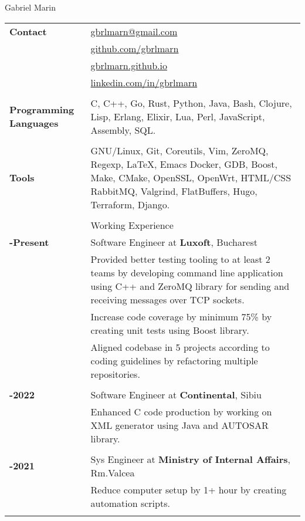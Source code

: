 \documentclass[a4paper,12pt]{article}
\begin{document}
\par {
  {\Huge Gabriel Marin}
  \bigskip
}

\begin{tabular}{>{\raggedleft\bfseries\arraybackslash}p{3cm}|>{\raggedright\arraybackslash}p{16cm}}
    Contact
    &\href{mailto:gbrlmarn@gmail.com}{gbrlmarn@gmail.com}\\
    &\href{https://github.com/gbrlmarn}{github.com/gbrlmarn}\\
    &\href{https://gbrlmarn.github.io}{gbrlmarn.github.io}\\
    &\href{https://linkedin.com/in/gbrlmarn}{linkedin.com/in/gbrlmarn}\\
    \\
Programming Languages & C, C++, Go, Rust, Python, Java, Bash, Clojure, Lisp, Erlang, Elixir, Lua, Perl, JavaScript, Assembly, SQL. \\
\\
Tools & GNU/Linux, Git, Coreutils, Vim, ZeroMQ, Regexp, \LaTeX, Emacs Docker, GDB, Boost, Make, CMake, OpenSSL, OpenWrt, HTML/CSS RabbitMQ, Valgrind, FlatBuffers, Hugo, Terraform, Django. \\
\\
  & Working Experience \\
  2022-Present & Software Engineer at \textbf{Luxoft}, Bucharest\\
  &\footnotesize{Provided better testing tooling to at least 2 teams by developing command line application using C++ and ZeroMQ library for sending and receiving messages over TCP sockets.}\\
  &\footnotesize{Increase code coverage by minimum 75\% by creating unit tests using Boost library.}\\
  &\footnotesize{Aligned codebase in 5 projects according to coding guidelines by refactoring multiple repositories.}\\
  \\
  2021-2022 &Software Engineer at \textbf{Continental}, Sibiu\\
  &\footnotesize{Enhanced C code production by working on XML generator using Java and AUTOSAR library.}\\
  \\
  2019-2021 & Sys Engineer at \textbf{Ministry of Internal Affairs}, Rm.Valcea\\
  &\footnotesize{Reduce computer setup by 1+ hour by creating automation scripts.}\\
  \\

\end{tabular}
\end{document}
